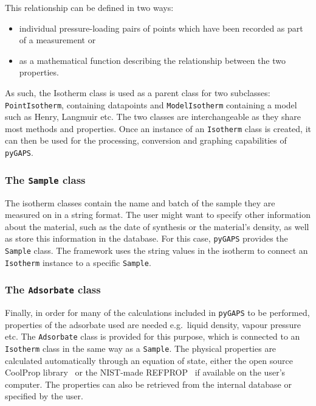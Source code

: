 This relationship can be defined in two ways:

\begin{itemize}
    \item individual pressure-loading pairs of points which have 
    been recorded as part of a measurement or
    \item as a mathematical function describing the relationship 
    between the two properties. 
\end{itemize}

As such, the Isotherm class is used as a parent class for two subclasses: 
\texttt{PointIsotherm}, containing datapoints and \texttt{ModelIsotherm} 
containing a model such as Henry, Langmuir etc. The two classes are interchangeable 
as they share most methods and properties. Once an instance of 
an \texttt{Isotherm} class is created, it can then be used for the 
processing, conversion and graphing capabilities of \texttt{pyGAPS}.

\subsubsection{The \texttt{Sample} class}

The isotherm classes contain the name and batch of the sample 
they are measured on in a string format. The user might want to 
specify other information about the material,
such as the date of synthesis or the material's density,
as well as store this information in the database.
For this case, \texttt{pyGAPS} provides the \texttt{Sample} class.
The framework uses the string values
in the isotherm to connect an \texttt{Isotherm} instance to a 
specific \texttt{Sample}.

\subsubsection{The \texttt{Adsorbate} class}

Finally, in order for many of the calculations included in 
\texttt{pyGAPS} to be performed, properties of the adsorbate 
used are needed e.g.\ liquid density, vapour pressure etc.
The \texttt{Adsorbate} class is provided for this purpose,
which is connected to an \texttt{Isotherm} class in the same way as a 
\texttt{Sample}. The physical properties are calculated 
automatically through an equation of state,
either the open source CoolProp library~\cite{bellPurePseudopureFluid2014} 
or the NIST-made REFPROP~\cite{lemmonNISTReferenceFluid1989} if available
on the user's computer. The properties can also be retrieved 
from the internal database or specified by the user.

